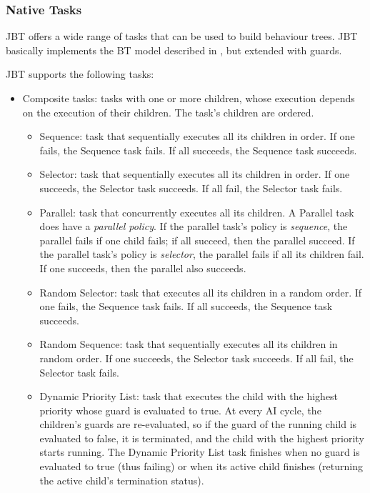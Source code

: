 \documentclass[a4paper]{article}
\begin{document}
\subsubsection{Native Tasks}

JBT offers a wide range of tasks that can be used to build behaviour trees. JBT basically implements the BT model described in \cite{Millington09}, but extended with guards.

JBT supports the following tasks:

\begin{itemize}
  \item Composite tasks: tasks with one or more children, whose execution depends on the execution of their children. The task's children are ordered.
  \begin{itemize}
    \item Sequence: task that sequentially executes all its children in order. If one fails, the Sequence task fails. If all succeeds, the Sequence task succeeds.
    \item Selector: task that sequentially executes all its children in order. If one succeeds, the Selector task succeeds. If all fail, the Selector task fails.
    \item Parallel: task that concurrently executes all its children. A Parallel task does have a \textit{parallel policy}. If the parallel task's policy is \textit{sequence}, the parallel fails if one child fails; if all succeed, then the parallel succeed. If the parallel task's policy is \textit{selector}, the parallel fails if all its children fail. If one succeeds, then the parallel also succeeds.
    \item Random Selector: task that executes all its children in a random order. If one fails, the Sequence task fails. If all succeeds, the Sequence task succeeds.
    \item Random Sequence: task that sequentially executes all its children in random order. If one succeeds, the Selector task succeeds. If all fail, the Selector task fails.
    \item Dynamic Priority List: task that executes the child with the highest priority whose guard is evaluated to true. At every AI cycle, the children's guards are re-evaluated, so if the guard of the running child is evaluated to false, it is terminated, and the child with the highest priority starts running. The Dynamic Priority List task finishes when no guard is evaluated to true (thus failing) or when its active child finishes (returning the active child's termination status).

\end{itemize}
\end{itemize}
\end{document}
